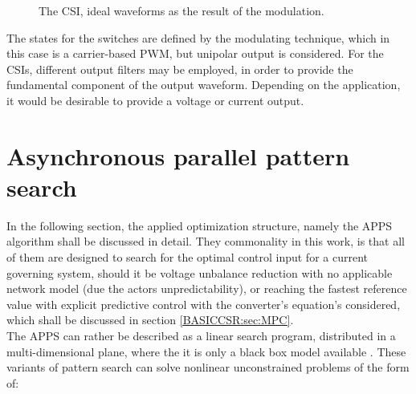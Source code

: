 {\begin{figure}[h!]
                \caption{The CSI, ideal waveforms as the result of the modulation.}
                \label{BASICCSR:fig:CSIwave_All}
            \end{figure}

The states for the switches are defined by the modulating technique, which in this case is a carrier-based PWM, but unipolar output is considered. For the CSIs, different output filters may be employed, in order to provide the fundamental component of the output waveform. Depending on the application, it would be desirable to provide a voltage or current output.

\section{Asynchronous parallel pattern search}\label{BASICUNB:sec:APPS}

In the following section, the applied optimization structure, namely the APPS algorithm shall be discussed in detail. %
They commonality in this work, is that all of them are designed to search for the optimal control input for a current governing system, should it be voltage unbalance reduction with no applicable network model (due the actors unpredictability), or reaching the fastest reference value with explicit predictive control with the converter's equation's considered, which shall be discussed in section \ref{BASICCSR:sec:MPC}.\\
The APPS can rather be described as a linear search program, distributed in a multi-dimensional plane, where the it is only a black box model available \cite{kolda2003understanding}. These variants of pattern search can solve nonlinear unconstrained problems of the form of:

}
